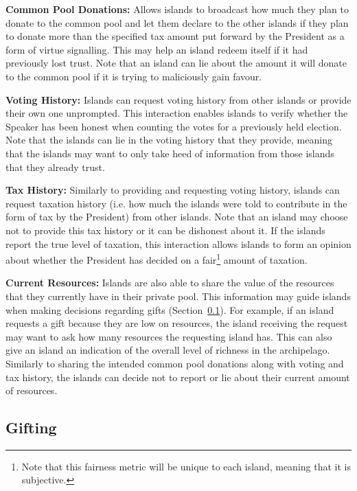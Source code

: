 \textbf{Common Pool Donations:} Allows islands to broadcast how much they plan to donate to the common pool and let them declare to the other islands if they plan to donate more than the specified tax amount put forward by the President as a form of virtue signalling. This may help an island redeem itself if it had previously lost trust. Note that an island can lie about the amount it will donate to the common pool if it is trying to maliciously gain favour.

\textbf{Voting History:} Islands can request voting history from other islands or provide their own one unprompted. This interaction enables islands to verify whether the Speaker has been honest when counting the votes for a previously held election. Note that the islands can lie in the voting history that they provide, meaning that the islands may want to only take heed of information from those islands that they already trust.

\textbf{Tax History:} Similarly to providing and requesting voting history, islands can request taxation history (i.e. how much the islands were told to contribute in the form of tax by the President) from other islands. Note that an island may choose not to provide this tax history or it can be dishonest about it. If the islands report the true level of taxation, this interaction allows islands to form an opinion about whether the President has decided on a fair\footnote{Note that this fairness metric will be unique to each island, meaning that it is subjective.} amount of taxation.

\textbf{Current Resources:} Islands are also able to share the value of the resources that they currently have in their private pool. This information may guide islands when making decisions regarding gifts (Section~\ref{subsec:IITO:gifting}). For example, if an island requests a gift because they are low on resources, the island receiving the request may want to ask how many resources the requesting island has. This can also give an island an indication of the overall level of richness in the archipelago. Similarly to sharing the intended common pool donations along with voting and tax history, the islands can decide not to report or lie about their current amount of resources.

\subsection{Gifting}  
\label{subsec:IITO:gifting}  

